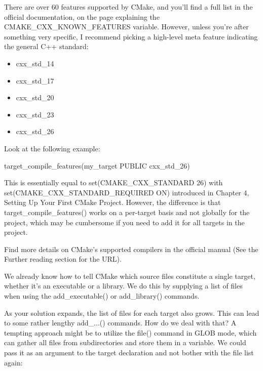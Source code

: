 There are over 60 features supported by CMake, and you’ll find a full list in the official documentation, on the page explaining the CMAKE\_CXX\_KNOWN\_FEATURES variable. However, unless you’re after something very specific, I recommend picking a high-level meta feature indicating the general C++ standard:

\begin{itemize}
\item
cxx\_std\_14

\item
cxx\_std\_17

\item
cxx\_std\_20

\item
cxx\_std\_23

\item
cxx\_std\_26
\end{itemize}

Look at the following example:

\begin{cmake}
target_compile_features(my_target PUBLIC cxx_std_26)
\end{cmake}

This is essentially equal to set(CMAKE\_CXX\_STANDARD 26) with set(CMAKE\_CXX\_STANDARD\_REQUIRED ON) introduced in Chapter 4, Setting Up Your First CMake Project. However, the difference is that target\_compile\_features() works on a per-target basis and not globally for the project, which may be cumbersome if you need to add it for all targets in the project.

Find more details on CMake’s supported compilers in the official manual (See the Further reading section for the URL).


We already know how to tell CMake which source files constitute a single target, whether it’s an executable or a library. We do this by supplying a list of files when using the add\_executable() or add\_library() commands.

As your solution expands, the list of files for each target also grows. This can lead to some rather lengthy add\_...() commands. How do we deal with that? A tempting approach might be to utilize the file() command in GLOB mode, which can gather all files from subdirectories and store them in a variable. We could pass it as an argument to the target declaration and not bother with the file list again:

